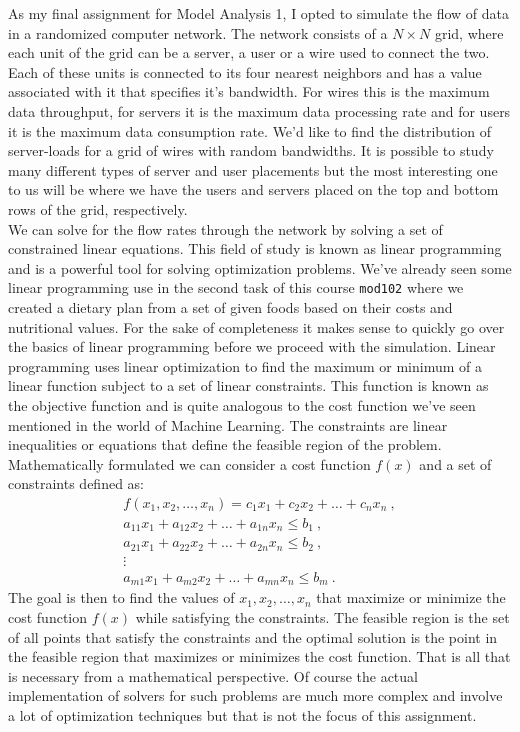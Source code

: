 \documentclass[10pt, titlepage, a4paper]{article}
\begin{document}
As my final assignment for Model Analysis 1, I opted to simulate the flow of data in a randomized computer network. The network 
consists of a $N\times N$ grid, where each unit of the grid can be a server, a user or a wire used to connect the two. Each of these 
units is connected to its four nearest neighbors and has a value associated with it that specifies it's bandwidth. For wires this is the 
maximum data throughput, for servers it is the maximum data processing rate and for users it is the maximum data consumption rate. We'd like 
to find the distribution of server-loads for a grid of wires with random bandwidths. It is possible to study many different types of 
server and user placements but the most interesting one to us will be where we have the users and servers placed on the top and bottom 
rows of the grid, respectively. \\

We can solve for the flow rates through the network by solving a set of constrained linear equations. This field of study is
known as linear programming and is a powerful tool for solving optimization problems. We've already seen some linear programming 
use in the second task of this course \texttt{mod102} where we created a dietary plan from a set of given foods based on their costs 
and nutritional values. For the sake of completeness it makes sense to quickly go over the basics of linear programming before we
proceed with the simulation. Linear programming uses linear optimization to find the maximum or minimum of a linear function
subject to a set of linear constraints. This function is known as the objective function and is quite analogous to the cost 
function we've seen mentioned in the world of Machine Learning. The constraints are linear inequalities or equations that
define the feasible region of the problem. Mathematically formulated we can consider a cost function $f(x)$ and a set of 
constraints defined as:
%
\begin{gather*}
    f(x_1, x_2, \dots, x_n) = c_1x_1 + c_2x_2 + \dots + c_nx_n\>, \\
    a_{11}x_1 + a_{12}x_2 + \dots + a_{1n}x_n \leq b_1\>, \\
    a_{21}x_1 + a_{22}x_2 + \dots + a_{2n}x_n \leq b_2\>, \\
    \vdots \\
    a_{m1}x_1 + a_{m2}x_2 + \dots + a_{mn}x_n \leq b_m\>.
\end{gather*}
%
The goal is then to find the values of $x_1, x_2, \dots, x_n$ that maximize or minimize the cost function $f(x)$ while satisfying
the constraints. The feasible region is the set of all points that satisfy the constraints and the optimal solution is the point in
the feasible region that maximizes or minimizes the cost function. That is all that is necessary from a mathematical perspective. Of course 
the actual implementation of solvers for such problems are much more complex and involve a lot of optimization techniques but that is 
not the focus of this assignment. \\
\end{document}
